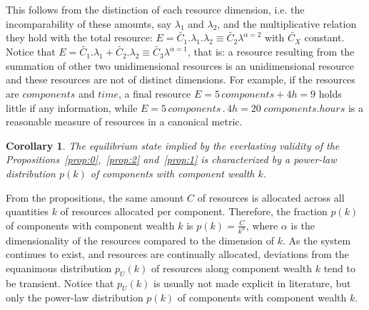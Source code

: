 \documentclass[a4paper, 11pt]{article} %
\newtheorem{corollary}[theorem2]{Corollary}
\begin{document}


%

This follows from the distinction of each resource dimension,
i.e. the incomparability of these amounts,
say $\lambda_1$ and $\lambda_2$,
and the multiplicative relation they hold with the total resource: $E=\widetilde{C_1} . \lambda_1 . \lambda_2 \equiv \widetilde{C_2}\lambda^{\alpha=2}$
with $\widetilde{C_X}$ constant.
Notice that $E=\widetilde{C_1} . \lambda_1 + \widetilde{C_2}.\lambda_2 \equiv \widetilde{C_3}\lambda^{\alpha=1}$, that is: a resource resulting from the summation of other two unidimensional resources is an unidimensional resource and these resources are not of distinct dimensions.
For example, if the resources are $components$ and $time$,
a final resource $E=5\, components + 4h=9$
holds little if any information, while
$E= 5\, components \, . \, 4 h= 20\; components . hours$ is
a reasonable measure of resources in a canonical metric.

\begin{corollary}\label{prop:3}
	The equilibrium state implied by the everlasting validity of the Propositions~\ref{prop:0},~\ref{prop:2} and~\ref{prop:1} is characterized by
	a power-law distribution $p(k)$ of components with component wealth $k$.
\end{corollary}

From the propositions, the same amount $C$ of resources is allocated
across all quantities $k$ of resources allocated per component.
Therefore, the fraction $p(k)$ of components with component wealth $k$ is
$p(k)=\frac{C}{k^\alpha}$, where $\alpha$ is
the dimensionality of the resources compared to the dimension of $k$.
As the system continues to exist,
and resources are continually allocated, deviations from the equanimous
distribution $p_U(k)$ of resources along component wealth $k$
 tend to be transient.
 Notice that $p_U(k)$ is usually not made explicit in literature, but only
 the power-law distribution $p(k)$ of components
with component wealth $k$.
\end{document}
